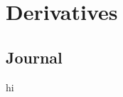 \documentclass[../main.tex]{subfiles}
\begin{document}
\chapter{Derivatives}\label{sct:12}
\section{Journal}
hi
\end{document}
